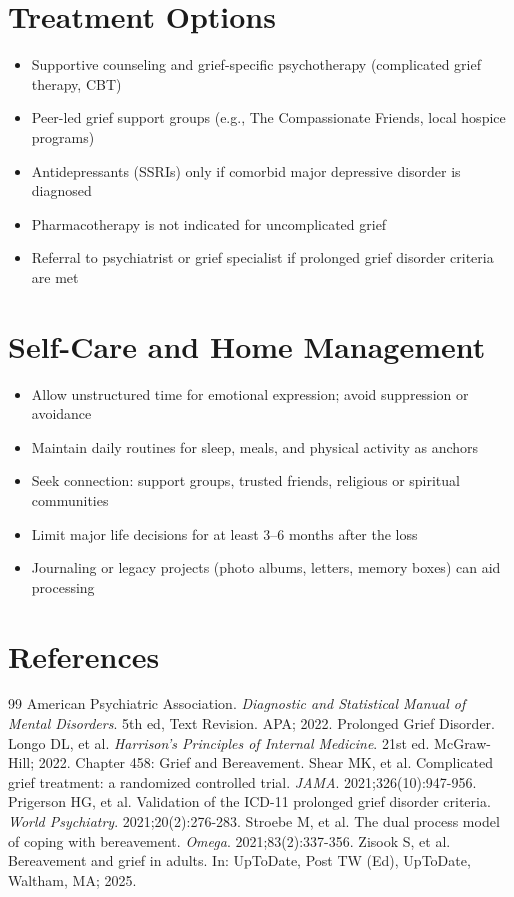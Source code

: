 \section*{Treatment Options}
\begin{itemize}
  \item Supportive counseling and grief-specific psychotherapy (complicated grief therapy, CBT)
  \item Peer-led grief support groups (e.g., The Compassionate Friends, local hospice programs)
  \item Antidepressants (SSRIs) only if comorbid major depressive disorder is diagnosed
  \item Pharmacotherapy is not indicated for uncomplicated grief
  \item Referral to psychiatrist or grief specialist if prolonged grief disorder criteria are met
\end{itemize}

\section*{Self-Care and Home Management}
\begin{itemize}
  \item Allow unstructured time for emotional expression; avoid suppression or avoidance
  \item Maintain daily routines for sleep, meals, and physical activity as anchors
  \item Seek connection: support groups, trusted friends, religious or spiritual communities
  \item Limit major life decisions for at least 3--6 months after the loss
  \item Journaling or legacy projects (photo albums, letters, memory boxes) can aid processing
\end{itemize}

\section*{References}

\begin{thebibliography}{99}
 American Psychiatric Association. \emph{Diagnostic and Statistical Manual of Mental Disorders}. 5th ed, Text Revision. APA; 2022. Prolonged Grief Disorder.
 Longo DL, et al. \emph{Harrison's Principles of Internal Medicine}. 21st ed. McGraw-Hill; 2022. Chapter 458: Grief and Bereavement.
 Shear MK, et al. Complicated grief treatment: a randomized controlled trial. \emph{JAMA}. 2021;326(10):947-956.
 Prigerson HG, et al. Validation of the ICD-11 prolonged grief disorder criteria. \emph{World Psychiatry}. 2021;20(2):276-283.
 Stroebe M, et al. The dual process model of coping with bereavement. \emph{Omega}. 2021;83(2):337-356.
 Zisook S, et al. Bereavement and grief in adults. In: UpToDate, Post TW (Ed), UpToDate, Waltham, MA; 2025.
\end{thebibliography}
